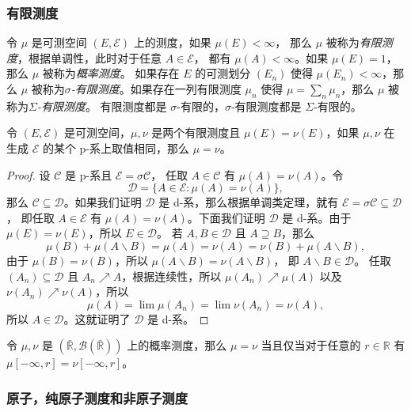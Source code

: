 \documentclass[fontset=none]{Notes}
\begin{document}
\subsubsection{有限测度}

令 $\mu$ 是可测空间 $(E,\mathcal{E})$ 上的测度，如果 $\mu(E)<\infty$，
那么 $\mu$ 被称为\emph{有限测度}，根据单调性，此时对于任意 $A\in \mathcal{E}$，
都有 $\mu(A)<\infty$。如果 $\mu(E)=1$，那么 $\mu$ 被称为\emph{概率测度}。
如果存在 $E$ 的可测划分 $(E_n)$ 使得 $\mu(E_n)<\infty$，那么
$\mu$ 被称为\emph{$\sigma$-有限测度}。如果存在一列有限测度 $\mu_n$
使得 $\mu=\sum_n \mu_n$，那么 $\mu$ 被称为\emph{$\Sigma$-有限测度}。
有限测度都是 $\sigma$-有限的，$\sigma$-有限测度都是 $\Sigma$-有限的。

\begin{proposition}
  令 $(E,\mathcal{E})$ 是可测空间，$\mu,\nu$ 是两个有限测度且 $\mu(E)=\nu(E)$，如果
  $\mu,\nu$ 在生成 $\mathcal{E}$ 的某个 p-系上取值相同，那么
  $\mu=\nu$。
\end{proposition}
\begin{proof}
  设 $\mathcal{C}$ 是 p-系且 $\mathcal{E}=\sigma \mathcal{C}$，
  任取 $A\in \mathcal{C}$ 有 $\mu(A)=\nu(A)$。令
  \[
    \mathcal{D}=\{A\in \mathcal{E}:\mu(A)=\nu(A)\},  
  \]
  那么 $\mathcal{C}\subseteq \mathcal{D}$。如果我们证明 $\mathcal{D}$
  是 d-系，那么根据单调类定理，就有 $\mathcal{E}=\sigma \mathcal{C}\subseteq \mathcal{D}$，
  即任取 $A\in \mathcal{E}$ 有 $\mu(A)=\nu(A)$。下面我们证明 $\mathcal{D}$
  是 d-系。由于 $\mu(E)=\nu(E)$，所以 $E\in \mathcal{D}$。
  若 $A,B\in \mathcal{D}$ 且 $A\supseteq B$，那么
  \[
    \mu(B)+\mu(A \smallsetminus B)= \mu(A)=\nu(A)=\nu(B)+\mu(A \smallsetminus B),
  \]
  由于 $\mu(B)=\nu(B)$，所以 $\mu(A \smallsetminus B)=\nu (A \smallsetminus B)$，
  即 $A \smallsetminus B\in \mathcal{D}$。
  任取 $(A_n)\subseteq \mathcal{D}$ 且 $A_n\nearrow A$，根据连续性，所以
  $\mu(A_n)\nearrow \mu(A)$ 以及 $\nu(A_n)\nearrow \nu(A)$，所以
  \[
    \mu(A)=\lim \mu(A_n)=\lim \nu(A_n)=\nu(A),  
  \]
  所以 $A\in \mathcal{D}$。这就证明了 $\mathcal{D}$ 是 d-系。
\end{proof}

\begin{corollary}
  令 $\mu,\nu$ 是 $\left(\bar{\mathbb{R}},\mathcal{B}\left(\bar{\mathbb{R}}\right)\right)$
  上的概率测度，那么 $\mu=\nu$ 当且仅当对于任意的 $r\in \mathbb{R}$ 有
  $\mu[-\infty,r]=\nu[-\infty, r]$。
\end{corollary}

\subsubsection{原子，纯原子测度和非原子测度}
\end{document}
